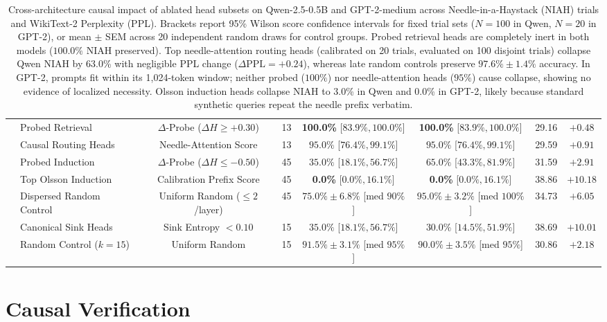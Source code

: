 \documentclass[11pt]{article}
\begin{document}
\begin{table}[t]
{\begin{tabular}{llcccccc}
& Probed Retrieval & $\Delta$-Probe ($\Delta H \ge +0.30$) & 13 & \textbf{100.0\%} [$83.9\%, 100.0\%$] & \textbf{100.0\%} [$83.9\%, 100.0\%$] & 29.16 & $+0.48$ \\
& Causal Routing Heads & Needle-Attention Score & 13 & $95.0\%$ [$76.4\%, 99.1\%$] & $95.0\%$ [$76.4\%, 99.1\%$] & 29.59 & $+0.91$ \\
& Probed Induction & $\Delta$-Probe ($\Delta H \le -0.50$) & 45 & $35.0\%$ [$18.1\%, 56.7\%$] & $65.0\%$ [$43.3\%, 81.9\%$] & 31.59 & $+2.91$ \\
& Top Olsson Induction & Calibration Prefix Score & 45 & \textbf{0.0\%} [$0.0\%, 16.1\%$] & \textbf{0.0\%} [$0.0\%, 16.1\%$] & 38.86 & $+10.18$ \\
& Dispersed Random Control & Uniform Random ($\le 2$/layer) & 45 & $75.0\% \pm 6.8\%$ [med $90\%$] & $95.0\% \pm 3.2\%$ [med $100\%$] & 34.73 & $+6.05$ \\
& Canonical Sink Heads & Sink Entropy $< 0.10$ & 15 & $35.0\%$ [$18.1\%, 56.7\%$] & $30.0\%$ [$14.5\%, 51.9\%$] & 38.69 & $+10.01$ \\
& Random Control ($k=15$) & Uniform Random & 15 & $91.5\% \pm 3.1\%$ [med $95\%$] & $90.0\% \pm 3.5\%$ [med $95\%$] & 30.86 & $+2.18$ \\
\bottomrule
\end{tabular}
}
\caption{Cross-architecture causal impact of ablated head subsets on Qwen-2.5-0.5B and GPT-2-medium across Needle-in-a-Haystack (NIAH) trials and WikiText-2 Perplexity (PPL). Brackets report 95\% Wilson score confidence intervals for fixed trial sets ($N=100$ in Qwen, $N=20$ in GPT-2), or mean $\pm$ SEM across 20 independent random draws for control groups. Probed retrieval heads are completely inert in both models ($100.0\%$ NIAH preserved). Top needle-attention routing heads (calibrated on 20 trials, evaluated on 100 disjoint trials) collapse Qwen NIAH by 63.0\% with negligible PPL change ($\Delta\text{PPL} = +0.24$), whereas late random controls preserve $97.6\% \pm 1.4\%$ accuracy. In GPT-2, prompts fit within its 1,024-token window; neither probed ($100\%$) nor needle-attention heads ($95\%$) cause collapse, showing no evidence of localized necessity. Olsson induction heads collapse NIAH to 3.0\% in Qwen and 0.0\% in GPT-2, likely because standard synthetic queries repeat the needle prefix verbatim.}
\label{tab:causal_main}
\end{table}

\section{Causal Verification}
\label{sec:verification}
\end{document}
